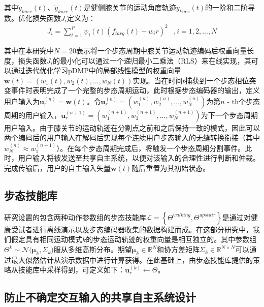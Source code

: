其中${\dot y_{knee}}(t)$、${\ddot y_{knee}}(t)$是健侧膝关节的运动角度轨迹${y_{knee}}(t)$的一阶和二阶导数。优化损失函数${J_i}$定义为：
\begin{equation}
  \label{deqn_ex12}
  \begin{array}{*{20}{c}}
    {{J_i} = \sum\limits_{t = 1}^P {{\psi _i}} (t){{\left( {{f_{targ}}(t) - {w_i}r} \right)}^2}}&{,i = 1,2,...,N} 
  \end{array}
\end{equation}       

其中在本研究中$N=20$表示将一个步态周期中膝关节运动轨迹编码后权重向量长度，损失函数${J_i}$的最小化可以通过一个递归最小二乘法（RLS）来在线实现，其可以通过迭代优化学习pDMP中的局部线性模型的权重向量$\pmb{w}(t)=({w_1}(t),{w_2}(t),...,{w_N}(t))$实现。当在时间$t$捕获到一个步态相位突变事件时表明完成了一个完整的步态周期运动，此时根据步态编码器的输出，定义用户输入为$\pmb{u}_r^{(n)} = \pmb{w}(t)$。令$\pmb{u}_r^{(n)} = (w_1^{(n)},w_2^{(n)},...,w_N^{(n)})$为第$n{\text{ - th}}$个步态周期的用户输入，$\pmb{u}_r^{(n + 1)} = (w_1^{(n + 1)},w_2^{(n + 1)},...,w_N^{(n + 1)})$为下一个步态周期用户输入。由于膝关节的运动轨迹在分割点之前和之后保持一致的模式，因此可以两个编码后的用户输入在解码后实现每个连续用户步态输入的无缝转换衔接（其中$w_N^{(n)}\approx w_1^{(n+1)}$）。在每个步态周期完成后，将触发一个步态周期分割事件。此时，用户输入将被发送至共享自主系统，以便对该输入的合理性进行判断和仲裁。完成传输后，用户的自主输入矢量$\pmb{w}(t)$随后重置为其初始状态。

\subsection{步态技能库}研究设置的包含两种动作参数组的步态技能库$\mathscr{L}=\left\{\Theta^{walking},\Theta^{upstair}\right\}$是通过对健康受试者进行离线演示以及步态编码器收集的数据构建而成。在这部分研究中，我们假定具有相同运动模式$ k $的步态运动轨迹的权重向量是相互独立的。其中参数组$\Theta^k \sim {\mathcal{N}}\pmb{(}{{\pmb{\mu }}_k},{\Sigma _k}\pmb{)}$服从多维高斯分布。期望${{\pmb{\mu }}_k} \in {\mathbb{R}^N}$和协方差矩阵${\Sigma _k} \in {\mathbb{R}^{N \times N}}$可以通过最大似然估计从演示数据中进行计算获得。在此基础上，由步态技能库提供的策略从技能库中采样得到，可定义如下：$\pmb{u}_r^{(k)}\leftarrow \Theta$。

\subsection{防止不确定交互输入的共享自主系统设计}
